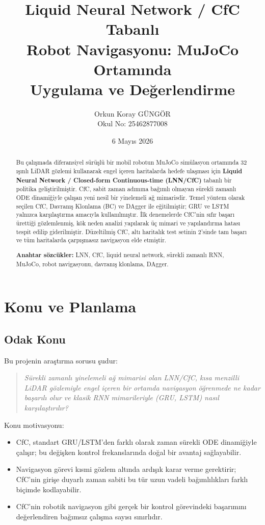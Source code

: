\documentclass[11pt,a4paper]{article}
\title{\textbf{Liquid Neural Network / CfC Tabanlı\\
Robot Navigasyonu: MuJoCo Ortamında\\
Uygulama ve Değerlendirme}}
\author{Orkun Koray GÜNGÖR \\ \small{Okul No: 25462877008}}
\date{6 Mayıs 2026}
\begin{document}
\shorthandoff{=}
\maketitle

\begin{abstract}
\noindent
Bu çalışmada diferansiyel sürüşlü bir mobil robotun MuJoCo simülasyon
ortamında 32 ışınlı LiDAR gözlemi kullanarak engel içeren haritalarda
hedefe ulaşması için \textbf{Liquid Neural Network / Closed-form
Continuous-time (LNN/CfC)} tabanlı bir politika geliştirilmiştir.
CfC, sabit zaman adımına bağımlı olmayan sürekli zamanlı ODE dinamiğiyle
çalışan yeni nesil bir yinelemeli ağ mimarisdir.
Temel yöntem olarak seçilen CfC, Davranış Klonlama (BC) ve DAgger ile
eğitilmiştir; GRU ve LSTM yalnızca karşılaştırma amacıyla kullanılmıştır.
İlk denemelerde CfC'nin sıfır başarı ürettiği gözlemlenmiş, kök neden
analizi yapılarak üç mimari ve yapılandırma hatası tespit edilip
giderilmiştir.
Düzeltilmiş CfC, altı haritalık test setinin 2'sinde tam başarı ve
tüm haritalarda çarpışmasız navigasyon elde etmiştir.

\vspace{0.5em}
\noindent\textbf{Anahtar sözcükler:}
LNN, CfC, liquid neural network, sürekli zamanlı RNN,
MuJoCo, robot navigasyonu, davranış klonlama, DAgger.
\end{abstract}

\section{Konu ve Planlama}

\subsection{Odak Konu}

Bu projenin araştırma sorusu şudur:

\begin{quote}
\emph{Sürekli zamanlı yinelemeli ağ mimarisi olan LNN/CfC, kısa menzilli
LiDAR gözlemiyle engel içeren bir ortamda navigasyon öğrenmede ne kadar
başarılı olur ve klasik RNN mimarileriyle (GRU, LSTM) nasıl karşılaştırılır?}
\end{quote}

Konu motivasyonu:
\begin{itemize}
  \item CfC, standart GRU/LSTM'den farklı olarak zaman sürekli ODE dinamiğiyle
  çalışır; bu değişken kontrol frekanslarında doğal bir avantaj sağlayabilir.
  \item Navigasyon görevi kısmi gözlem altında ardışık karar verme gerektirir;
  CfC'nin girişe duyarlı zaman sabiti bu tür uzun vadeli bağımlılıkları
  farklı biçimde kodlayabilir.
  \item CfC'nin robotik navigasyon gibi gerçek bir kontrol görevindeki
  başarımını değerlendiren bağımsız çalışma sayısı sınırlıdır.
\end{itemize}
\end{document}

